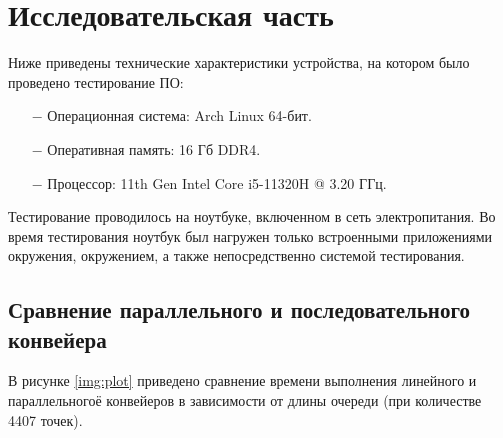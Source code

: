 \chapter{Исследовательская часть}

Ниже приведены технические характеристики устройства, на котором было проведено тестирование ПО:

\begin{itemize}
    \item[$-$] Операционная система: Arch Linux \cite{arch} 64-бит.
    \item[$-$] Оперативная память: 16 Гб DDR4.
    \item[$-$] Процессор: 11th Gen Intel\textsuperscript{\tiny\textregistered} Core\textsuperscript{\tiny\texttrademark} i5-11320H @ 3.20 ГГц\cite{i5}.
\end{itemize}

Тестирование проводилось на ноутбуке, включенном в сеть электропитания. Во время тестирования ноутбук был нагружен только встроенными приложениями окружения, окружением, а также непосредственно системой тестирования.

\section{Сравнение параллельного и последовательного конвейера}

В рисунке \ref{img:plot} приведено сравнение времени выполнения линейного и параллельногоё конвейеров в зависимости от длины очереди (при количестве 4407 точек).

\clearpage

